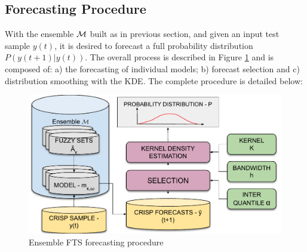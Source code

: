 %
\subsection{Forecasting Procedure}
\label{sec:ensemblefts_forecasting}

With the ensemble $\mathcal{M}$ built as in previous section, and given an input test sample $y(t)$, it is desired to forecast a full probability distribution $P(y(t+1)|y(t))$. The overall process is described in Figure \ref{fig:ensemblefts_forecasting} and is composed of: a) the forecasting of individual models; b) forecast selection and c) distribution smoothing with the KDE. The complete procedure is detailed below:

\begin{figure}[htb]
\includegraphics[width=\textwidth]{figures/ensemblefts_forecasting.pdf}
\caption{Ensemble FTS forecasting procedure}
\label{fig:ensemblefts_forecasting}
\end{figure}

